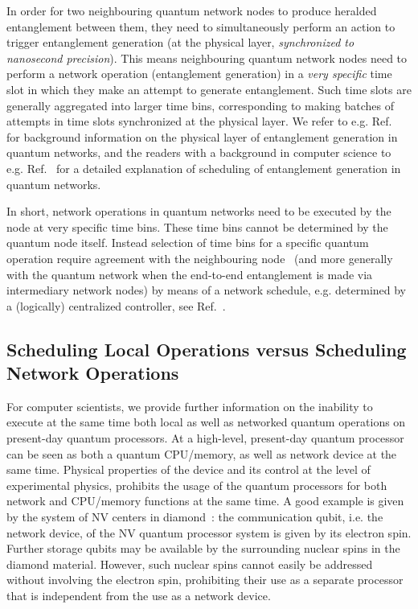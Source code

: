 In order for two neighbouring quantum network nodes to produce heralded entanglement between them, they need to simultaneously perform an action to trigger entanglement generation (at the physical layer, \emph{synchronized to nanosecond precision}). This means neighbouring quantum network nodes need to perform a network operation (entanglement generation) in a \emph{very specific} time slot in which they make an attempt to generate entanglement. Such time slots are generally aggregated into larger time bins, corresponding to making batches of attempts in time slots synchronized at the physical layer. We refer to e.g. Ref.~\cite{pompili_2022_experimental} for background information on the physical layer of entanglement generation in quantum networks, and the readers with a background in computer science to e.g. Ref.~\cite{dahlberg_2019_egp} for a detailed explanation of scheduling of entanglement generation in quantum networks.

In short, network operations in quantum networks need to be executed by the node at very specific time bins. These time bins cannot be determined by the quantum node itself. Instead selection of time bins for a specific quantum operation require agreement with the neighbouring node~\cite{dahlberg_2019_egp} (and more generally with the quantum network when the end-to-end entanglement is made via intermediary network nodes) by means of a network schedule, e.g. determined by a (logically) centralized controller, see Ref.~\cite{skrzypczyk_2021_arch}.

\subsection{Scheduling Local Operations versus Scheduling Network Operations}

For computer scientists, we provide further information on the inability to execute at the same time both local as well as networked quantum operations on present-day quantum processors. At a high-level, present-day quantum processor can be seen as both a quantum \ac{CPU}/memory, as well as network device at the same time. Physical properties of the device and its control at the level of experimental physics, prohibits the usage of the quantum processors for both network and \ac{CPU}/memory functions at the same time. A good example is given by the system of \ac{NV} centers in diamond~\cite{kalb_2017_entanglement,humphreys_2018_delivery}: the communication qubit, i.e. the network device, of the \ac{NV} quantum processor system is given by its electron spin. Further storage qubits may be available by the surrounding nuclear spins in the diamond material. However, such nuclear spins cannot easily be addressed without involving the electron spin, prohibiting their use as a separate processor that is independent from the use as a network device. 

